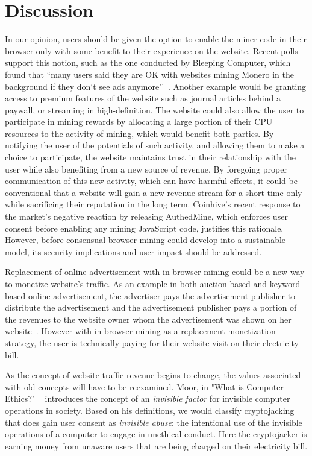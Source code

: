 
\section{Discussion}
\label{sec:ethics}

In our opinion, users should be given the option to enable the miner code in their browser only with some benefit to their experience on the website. Recent polls support this notion, such as the one conducted by Bleeping Computer, which found that ``many users said they are OK with websites mining Monero in the background if they don`t see ads anymore''~\cite{bleepingcomputerminers}. Another example would be granting access to premium features of the website such as journal articles behind a paywall, or streaming in high-definition. The website could also allow the user to participate in mining rewards by allocating a large portion of their CPU resources to the activity of mining, which would benefit both parties. By notifying the user of the potentials of such activity, and allowing them to make a choice to participate, the website maintains trust in their relationship with the user while also benefiting from a new source of revenue. By foregoing proper communication of this new activity, which can have harmful effects, it could be conventional that a website will gain a new revenue stream for a short time only while sacrificing their reputation in the long term. Coinhive's recent response to the market's negative reaction by releasing AuthedMine, which enforces user consent before enabling any mining JavaScript code, justifies this rationale. However, before consensual browser mining could develop into a sustainable model, its security implications and user impact should be addressed.

Replacement of online advertisement with in-browser mining could be a new way to monetize website's traffic. As an example in both auction-based and keyword-based online advertisement, the advertiser pays the advertisement publisher to distribute the advertisement and the advertisement publisher pays a portion of the revenues to the website owner whom the advertisement was shown on her website~\cite{king2007internet}. However with in-browser mining as a replacement monetization strategy, the user is technically paying for their website visit on their electricity bill. 

As the concept of website traffic revenue begins to change, the values associated with  old concepts will have to be reexamined. Moor, in "What is Computer Ethics?" ~\cite{moor1985computer} introduces the concept of an \textit{invisible factor} for invisible computer operations in society. Based on his definitions, we would classify cryptojacking that does gain user consent as \textit{invisible abuse}: the intentional use of the invisible operations of a computer to engage in unethical conduct. Here the cryptojacker is earning money from unaware users that are being charged on their electricity bill. 

